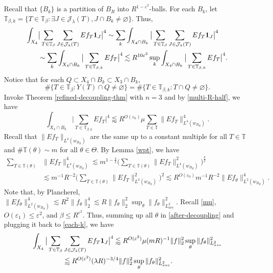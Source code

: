\documentclass{amsart}
\numberwithin{equation}{section}
\newcommand{\be}{\beta}
\newcommand{\e}{\varepsilon}
\newcommand{\la}{\lambda}
\newcommand{\cj}{\mathcal J}
\newcommand{\ZT}{\mathbb{T}}
\newcommand{\Id}{{\bf 1}}
\begin{document}
Recall that $\{B_k\}$ is a partition of $B_R$ into $R^{1-\e^2}$-balls. 
For each $B_k$, let $\ZT_{\be, k}=\{T\in\ZT_\be: \exists J\in\cj_{\la}(T), J\cap B_k\not=\varnothing\}$.
Thus,
\begin{align}
    \int_{X_4}&\big|\sum_{T\in\ZT_\be}\sum_{J\in\cj_\la(T)}Ef_{T}\Id_J\big|^4\sim\sum_k\int_{X_4\cap B_k}\big|\sum_{T\in\ZT_\be}\sum_{J\in\cj_\la(T)}Ef_{T}\Id_J\big|^4\\ \label{each-k}
    &\sim \sum_k\int_{X_4\cap B_k}\big|\sum_{T\in\ZT_{\be, k}}Ef_{T}\big|^4\lesssim R^{10\e^2}\sup_k\int_{X_4\cap B_k}\big|\sum_{T\in\ZT_{\be, k}}Ef_{T}\big|^4.
\end{align}
Notice that for each $Q\subset X_4\cap B_k\subset X_3\cap B_k$,
\begin{equation}
    \#\{T\in\ZT_\be:Y(T)\cap Q\not=\varnothing\}=\#\{T\in\ZT_{\be,k}:T\cap Q\not=\varnothing\}.
\end{equation}
Invoke Theorem \ref{refined-decoupling-thm} with $n=3$ and by \eqref{multi-R-half}, we have
\begin{equation}
    \int_{X_4\cap B_k}\big|\sum_{T\in\ZT_{\be,k}}Ef_{T}\big|^4\lessapprox  R^{O(\e_0)} \mu\sum_{T\in\ZT}\big\|Ef_T\big\|_{L^4(w_{B_R})}^4.
\end{equation}
Recall that $\|Ef_T\|_{L^4(w_{B_R})}$ are  the same up to a constant multiple for all $T\in\ZT$ and $\#\ZT(\theta)\sim m$ for all $\theta\in\Theta$.
By Lemma \ref{wpt}, we have
\begin{align}
    \sum_{T\in\ZT(\theta)}&\big\|Ef_T\big\|_{L^4(w_{B_R})}^4\lesssim m^{1-\frac{4}{2}}\Big(\sum_{T\in\ZT(\theta)}\big\|Ef_T\big\|_{L^4(w_{B_R})}^2\Big)^{\frac{4}{2}}\\\label{after-decoupling}
    &\lesssim m^{-1}R^{-2} \Big(\sum_{T\in\ZT(\theta)}\big\|Ef_T\big\|_{L^2(w_{B_R})}^2\Big)^2\lesssim R^{O(\e_0)} m^{-1}R^{-2} \big\|Ef_\theta\big\|_{L^2(w_{B_R})}^4.
\end{align}
Note that, by Plancherel, $\|Ef_\theta\|_{L^2(w_{B_R})}^4\lesssim R^2\|f_\theta\|_2^4\lesssim R\|f_\theta\|_2^2\sup_\theta\|f_\theta\|_{L^2_{ave}}^2$. 
Recall \eqref{mu}, $O(\e_1)\leq\e^2$, and $\be\leq R^{\e^2}$.
Thus, summing up all $\theta$ in \eqref{after-decoupling} and plugging it back to \eqref{each-k}, we have
\begin{align}
\label{l4}
    \int_{X_4}\big|\sum_{T\in\ZT_\be}&\sum_{J\in\cj_\la(T)}Ef_{T}\Id_J\big|^4\lessapprox R^{O(\e^2)}\mu (m R)^{-1}\|f\|_2^2\sup_\theta\|f_\theta\|_{L^2_{ave}}^2\\
    &\lessapprox R^{O(\e^{2})}(\la R)^{-3/4}\|f\|_2^2\sup_\theta\|f_\theta\|_{L^2_{ave}}^2.
\end{align}
\end{document}
